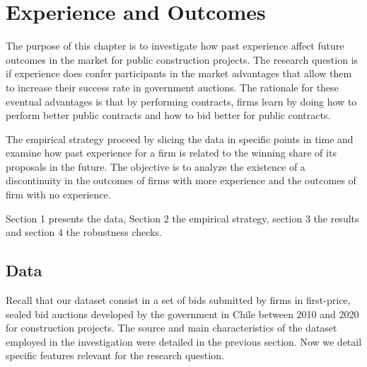 \chapter{Experience and Outcomes
}
The purpose of this chapter is to investigate how past experience affect future outcomes in the market for public construction projects. The research question is if experience does confer participants in the market advantages that allow them to increase their success rate in government auctions. The rationale for these eventual  advantages is that by performing contracts, firms learn by doing how to perform better public contracts and how to bid better for public contracts.

The empirical strategy proceed by slicing the data in specific points in time and examine how past experience for a firm is related to the winning share of its proposals in the future. The objective is to analyze the existence of a discontinuity in the outcomes of firms with more experience and the outcomes of firm with no experience.

 Section 1 presents the data, Section 2 the empirical strategy, section 3 the results and section 4 the robustness checks.

\section{Data}
\label{section:datamain}
Recall that our dataset consist in a set of bids submitted by firms in first-price, sealed bid auctions developed by the government in Chile between 2010 and 2020 for construction projects. The source and main characteristics of the dataset employed in the investigation were detailed in the previous section. Now we detail specific features relevant for the research question.


